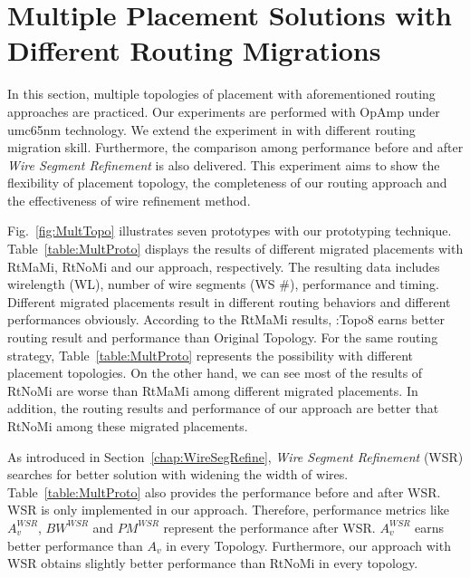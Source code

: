   \section{Multiple Placement Solutions with Different Routing Migrations}\label{sec:ExpMultiProto}

    In this section, multiple topologies of placement with aforementioned routing approaches are practiced. Our experiments are performed with OpAmp under umc65nm technology. 
    We extend the experiment in \cite{Chin_DMR_ICCAD2013} with different routing migration skill. Furthermore, the comparison among performance before and after {\it Wire Segment Refinement} is also delivered. This experiment aims to show the flexibility of placement topology, the completeness of our routing approach and the effectiveness of wire refinement method.

    Fig.~\ref{fig:MultTopo} illustrates seven prototypes with our prototyping technique. Table~\ref{table:MultProto} displays the results of different migrated placements with RtMaMi, RtNoMi and our approach, respectively. The resulting data includes wirelength (WL), number of wire segments (WS \#), performance and timing. Different migrated placements result in different routing behaviors and different performances obviously. According to the RtMaMi results, \cite{ALP_YPWeng_iccad2011}:Topo8 earns better routing result and performance than Original Topology. For the same routing strategy, Table~\ref{table:MultProto} represents the possibility with different placement topologies. On the other hand, we can see most of the results of RtNoMi are worse than RtMaMi among different migrated placements. In addition, the routing results and performance of our approach are better that RtNoMi among these migrated placements. 

    As introduced in Section~\ref{chap:WireSegRefine}, {\it Wire Segment Refinement} (WSR) searches for better solution with widening the width of wires. Table~\ref{table:MultProto} also provides the performance before and after WSR. WSR is only implemented in our approach. Therefore, performance metrics like $A_v^{WSR}$, $BW^{WSR}$ and $PM^{WSR}$ represent the performance after WSR. $A_v^{WSR}$ earns better performance than $A_v$ in every Topology. Furthermore, our approach with WSR obtains slightly better performance than RtNoMi in every topology.

